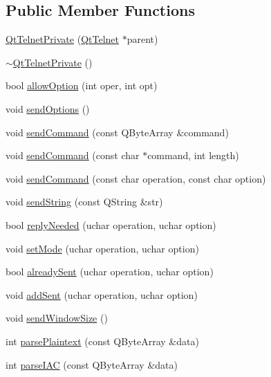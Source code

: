 \subsection*{Public Member Functions}
\begin{DoxyCompactItemize}
\item 
\hyperlink{classQtTelnetPrivate_aec32e6a37ffe8e3463ec1dce83b88882}{QtTelnetPrivate} (\hyperlink{classQtTelnet}{QtTelnet} $\ast$parent)
\item 
\hyperlink{classQtTelnetPrivate_a64c056f9faf47ae076260359cd800c0f}{$\sim$QtTelnetPrivate} ()
\item 
bool \hyperlink{classQtTelnetPrivate_a065b1e26480f7adfba32055f11e58be3}{allowOption} (int oper, int opt)
\item 
void \hyperlink{classQtTelnetPrivate_a5ef8a8e0dac6d4f22f3b321523ce2c2b}{sendOptions} ()
\item 
void \hyperlink{classQtTelnetPrivate_a56326b558d3ceaea90abec25fa2fdf70}{sendCommand} (const QByteArray \&command)
\item 
void \hyperlink{classQtTelnetPrivate_a9fc01a0012b6c20ec64e9447fc6dc104}{sendCommand} (const char $\ast$command, int length)
\item 
void \hyperlink{classQtTelnetPrivate_abf61d8563f370b8a279b785e164a3abe}{sendCommand} (const char operation, const char option)
\item 
void \hyperlink{classQtTelnetPrivate_a1e133bd1afc78ef83c24fa02f8065ca6}{sendString} (const QString \&str)
\item 
bool \hyperlink{classQtTelnetPrivate_a507a8b94a1b244db6ca550d26ee0bd66}{replyNeeded} (uchar operation, uchar option)
\item 
void \hyperlink{classQtTelnetPrivate_aba4517cfd26c48d3cb4814c870699d95}{setMode} (uchar operation, uchar option)
\item 
bool \hyperlink{classQtTelnetPrivate_a15171a07533bd81ac5fe803b6189215d}{alreadySent} (uchar operation, uchar option)
\item 
void \hyperlink{classQtTelnetPrivate_a03a34fe9c77fe778c3a5fe74783611eb}{addSent} (uchar operation, uchar option)
\item 
void \hyperlink{classQtTelnetPrivate_aa71ecdd44e469c963cce025bd155f35b}{sendWindowSize} ()
\item 
int \hyperlink{classQtTelnetPrivate_af51d95e209673d006412d53264073573}{parsePlaintext} (const QByteArray \&data)
\item 
int \hyperlink{classQtTelnetPrivate_af6841ecc23b684b6b14065d9134795ba}{parseIAC} (const QByteArray \&data)

\end{DoxyCompactItemize}
